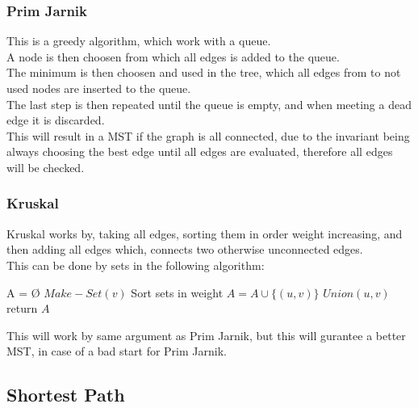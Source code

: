 \documentclass[12pt, a4paper]{article}
\begin{document}
			\subsubsection{Prim Jarnik}
				This is a greedy algorithm, which work with a queue.\\
				A node is then choosen from which all edges is added to the queue.\\
				The minimum is then choosen and used in the tree, which all edges from to not used nodes are inserted to the queue.\\
				The last step is then repeated until the queue is empty, and when meeting a dead edge it is discarded.\\
				This will result in a MST if the graph is all connected, due to the invariant being always choosing the best edge until all edges are evaluated, therefore all edges will be checked.
			\subsubsection{Kruskal}
				Kruskal works by, taking all edges, sorting them in order weight increasing, and then adding all edges which, connects two otherwise unconnected edges.\\
				This can be done by sets in the following algorithm:
				\begin{algorithmic}[1]
					\State A = Ø
						\State $Make-Set(v)$
					\EndFor
					\State Sort sets in weight 
							\State $A=A\cup \{(u,v)\}$
							\State $Union(u,v)$
						\EndIf
					\EndFor
					\State return $A$
				\end{algorithmic}
				This will work by same argument as Prim Jarnik, but this will gurantee a better MST, in case of a bad start for Prim Jarnik.
				
		\subsection{Shortest Path}
		
\end{document}
